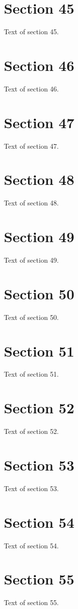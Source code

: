 \documentclass{article}
\begin{document}
\section{Section 45}
Text of section 45.

\section{Section 46}
Text of section 46.

\section{Section 47}
Text of section 47.

\section{Section 48}
Text of section 48.

\section{Section 49}
Text of section 49.

\section{Section 50}
Text of section 50.

\section{Section 51}
Text of section 51.

\section{Section 52}
Text of section 52.

\section{Section 53}
Text of section 53.

\section{Section 54}
Text of section 54.

\section{Section 55}
Text of section 55.
\end{document}
